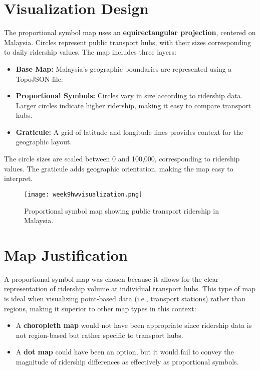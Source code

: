 \documentclass{article}
\begin{document}
\section*{Visualization Design}
The proportional symbol map uses an \textbf{equirectangular projection}, centered on Malaysia. Circles represent public transport hubs, with their sizes corresponding to daily ridership values. The map includes three layers:
\begin{itemize}
    \item \textbf{Base Map:} Malaysia’s geographic boundaries are represented using a TopoJSON file.
    \item \textbf{Proportional Symbols:} Circles vary in size according to ridership data. Larger circles indicate higher ridership, making it easy to compare transport hubs.
    \item \textbf{Graticule:} A grid of latitude and longitude lines provides context for the geographic layout.
\end{itemize}

The circle sizes are scaled between 0 and 100,000, corresponding to ridership values. The graticule adds geographic orientation, making the map easy to interpret.

\begin{figure}[h!]
    \centering
    \texttt{[image: week9hwvisualization.png]}
    \caption{Proportional symbol map showing public transport ridership in Malaysia.}
\end{figure}

\section*{Map Justification}
A proportional symbol map was chosen because it allows for the clear representation of ridership volume at individual transport hubs. This type of map is ideal when visualizing point-based data (i.e., transport stations) rather than regions, making it superior to other map types in this context:
\begin{itemize}
    \item A \textbf{choropleth map} would not have been appropriate since ridership data is not region-based but rather specific to transport hubs.
    \item A \textbf{dot map} could have been an option, but it would fail to convey the magnitude of ridership differences as effectively as proportional symbols.
\end{itemize}
\end{document}
